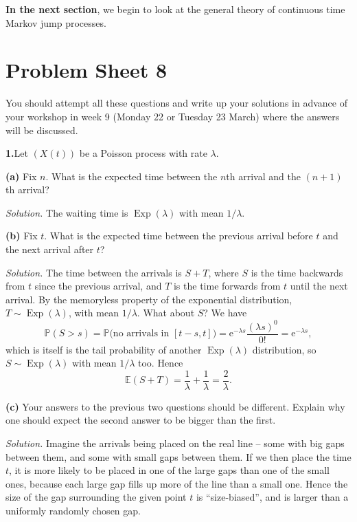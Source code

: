 \documentclass[
  a4paper,
]{article}
\newif\ifcomm\commtrue
\theoremstyle{definition}
\theoremstyle{definition}
\theoremstyle{definition}
\theoremstyle{remark}
\begin{document}
\textbf{In the next section}, we begin to look at the general theory of continuous time Markov jump processes.

\hypertarget{P08}{%
\section*{Problem Sheet 8}\label{P08}}

\commfalse

You should attempt all these questions and write up your solutions in advance of your workshop in week 9 (Monday 22 or Tuesday 23 March) where the answers will be discussed.

\textbf{1.}Let \((X(t))\) be a Poisson process with rate \(\lambda\).

\textbf{(a)} Fix \(n\). What is the expected time between the \(n\)th arrival and the \((n+1)\)th arrival?

\begin{myanswers}
\emph{Solution.} The waiting time is \(\operatorname{Exp}(\lambda)\) with mean \(1/\lambda\).

\end{myanswers}

\textbf{(b)} Fix \(t\). What is the expected time between the previous arrival before \(t\) and the next arrival after \(t\)?

\begin{myanswers}
\emph{Solution.} The time between the arrivals is \(S + T\), where \(S\) is the time backwards from \(t\) since the previous arrival, and \(T\) is the time forwards from \(t\) until the next arrival. By the memoryless property of the exponential distribution, \(T \sim \operatorname{Exp}(\lambda)\), with mean \(1/\lambda\). What about \(S\)? We have
\[ \mathbb P(S > s) = \mathbb P\big(\text{no arrivals in }[t-s,t]\big) = \mathrm{e}^{-\lambda s} \frac{(\lambda s)^0}{0!} = \mathrm{e}^{-\lambda s} , \]
which is itself is the tail probability of another \(\operatorname{Exp}(\lambda)\) distribution, so \(S \sim \operatorname{Exp}(\lambda)\) with mean \(1/\lambda\) too.
Hence
\[ \mathbb E(S + T) = \frac1\lambda + \frac1\lambda = \frac2\lambda .\]

\end{myanswers}

\textbf{(c)} Your answers to the previous two questions should be different. Explain why one should expect the second answer to be bigger than the first.

\begin{myanswers}
\emph{Solution.} Imagine the arrivals being placed on the real line -- some with big gaps between them, and some with small gaps between them. If we then place the time \(t\), it is more likely to be placed in one of the large gaps than one of the small ones, because each large gap fills up more of the line than a small one. Hence the size of the gap surrounding the given point \(t\) is ``size-biased'', and is larger than a uniformly randomly chosen gap.

\end{myanswers}
\end{document}
